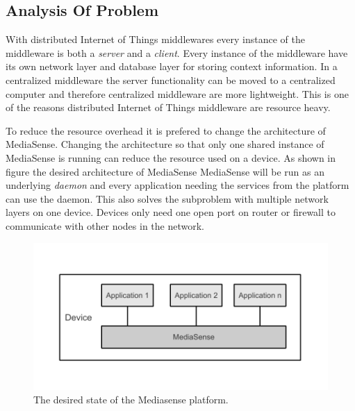 \subsection{Analysis Of Problem}
With distributed Internet of Things middlewares every instance of the middleware is both a \emph{server} and a \emph{client}. Every instance of the middleware have its own network layer and database layer for storing context information. In a centralized middleware the server functionality can be moved to a centralized computer and therefore centralized middleware are more lightweight. This is one of the reasons distributed Internet of Things middleware are resource heavy. 

To reduce the resource overhead it is prefered to change the architecture of MediaSense. Changing the architecture so that only one shared instance of MediaSense is running can reduce the resource used on a device.  As shown in figure the desired architecture of MediaSense MediaSense will be run as an underlying  \emph{daemon} and every application needing the services from the platform can use the daemon. This also solves the subproblem with multiple network layers on one device. Devices only need one open port on router or firewall to communicate with other nodes in the network.  

\begin{figure}[h!]
	\centering
    	\includegraphics[scale=0.75]{part_4/result_and_analysis/mediasense_arch_new.pdf}
    	\centering
		\caption{The desired state of the Mediasense platform.} 
\end{figure}
